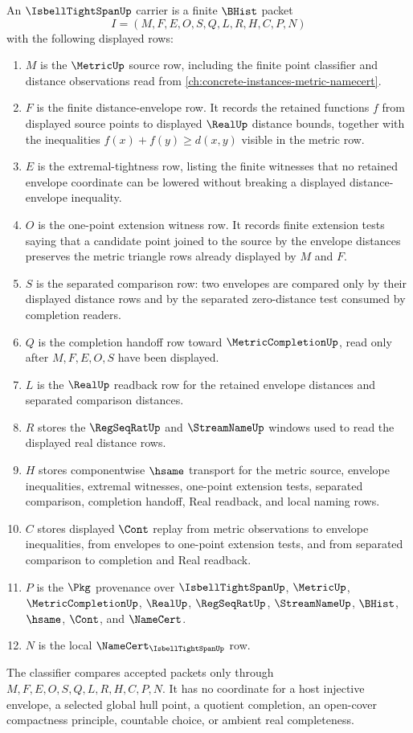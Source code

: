 \begin{definition}
\label{def:isbell-tight-span-carrier}
An $\IsbellTightSpanUp$ carrier is a finite $\BHist$ packet
$$
I=(M,F,E,O,S,Q,L,R,H,C,P,N)
$$
with the following displayed rows:
\begin{enumerate}
\item $M$ is the $\MetricUp$ source row, including the finite point classifier and distance observations read from \autoref{ch:concrete-instances-metric-namecert}.
\item $F$ is the finite distance-envelope row. It records the retained functions $f$ from displayed source points to displayed $\RealUp$ distance bounds, together with the inequalities $f(x)+f(y)\ge d(x,y)$ visible in the metric row.
\item $E$ is the extremal-tightness row, listing the finite witnesses that no retained envelope coordinate can be lowered without breaking a displayed distance-envelope inequality.
\item $O$ is the one-point extension witness row. It records finite extension tests saying that a candidate point joined to the source by the envelope distances preserves the metric triangle rows already displayed by $M$ and $F$.
\item $S$ is the separated comparison row: two envelopes are compared only by their displayed distance rows and by the separated zero-distance test consumed by completion readers.
\item $Q$ is the completion handoff row toward $\MetricCompletionUp$, read only after $M,F,E,O,S$ have been displayed.
\item $L$ is the $\RealUp$ readback row for the retained envelope distances and separated comparison distances.
\item $R$ stores the $\RegSeqRatUp$ and $\StreamNameUp$ windows used to read the displayed real distance rows.
\item $H$ stores componentwise $\hsame$ transport for the metric source, envelope inequalities, extremal witnesses, one-point extension tests, separated comparison, completion handoff, Real readback, and local naming rows.
\item $C$ stores displayed $\Cont$ replay from metric observations to envelope inequalities, from envelopes to one-point extension tests, and from separated comparison to completion and Real readback.
\item $P$ is the $\Pkg$ provenance over $\IsbellTightSpanUp$, $\MetricUp$, $\MetricCompletionUp$, $\RealUp$, $\RegSeqRatUp$, $\StreamNameUp$, $\BHist$, $\hsame$, $\Cont$, and $\NameCert$.
\item $N$ is the local $\NameCert_{\IsbellTightSpanUp}$ row.
\end{enumerate}
The classifier compares accepted packets only through $M,F,E,O,S,Q,L,R,H,C,P,N$. It has no coordinate for a host injective envelope, a selected global hull point, a quotient completion, an open-cover compactness principle, countable choice, or ambient real completeness.
\end{definition}

